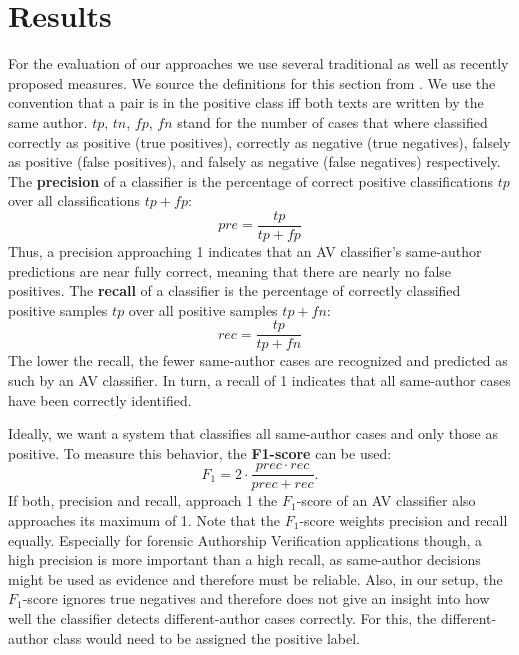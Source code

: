 \chapter{Results}\label{results}
For the evaluation of our approaches we use several traditional as well as recently proposed measures.
We source the definitions for this section from \cite{schutze2008introduction}.
We use the convention that a pair is in the positive class iff both texts are written by the same author.
$tp$, $tn$, $fp$, $fn$ stand for the number of cases that where classified correctly as positive (true positives), correctly as negative (true negatives), falsely as positive (false positives), and falsely as negative (false negatives) respectively.\newline
The \textbf{precision} of a classifier is the percentage of correct positive classifications $tp$ over all classifications $tp+fp$: \[pre = \frac{tp}{tp+fp}\]
Thus, a precision approaching 1 indicates that an AV classifier's same-author predictions are near fully correct, meaning that there are nearly no false positives.\newline
The \textbf{recall} of a classifier is the percentage of correctly classified positive samples $tp$ over all positive samples $tp+fn$: \[rec = \frac{tp}{tp+fn}\]
The lower the recall, the fewer same-author cases are recognized and predicted as such by an AV classifier.
In turn, a recall of 1 indicates that all same-author cases have been correctly identified.

Ideally, we want a system that classifies all same-author cases and only those as positive.
To measure this behavior, the \textbf{F1-score} can be used: \[F_1 = 2\cdot\frac{prec\cdot{}rec}{prec+rec}.\]
If both, precision and recall, approach 1 the $F_1$-score of an AV classifier also approaches its maximum of 1.
Note that the $F_1$-score weights precision and recall equally.
Especially for forensic Authorship Verification applications though, a high precision is more important than a high recall, as same-author decisions might be used as evidence and therefore must be reliable.
Also, in our setup, the $F_1$-score ignores true negatives and therefore does not give an insight into how well the classifier detects different-author cases correctly.
For this, the different-author class would need to be assigned the positive label.

